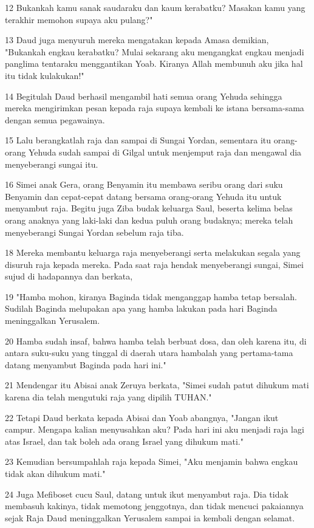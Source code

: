 \par 12 Bukankah kamu sanak saudaraku dan kaum kerabatku? Masakan kamu yang terakhir memohon supaya aku pulang?"
\par 13 Daud juga menyuruh mereka mengatakan kepada Amasa demikian, "Bukankah engkau kerabatku? Mulai sekarang aku mengangkat engkau menjadi panglima tentaraku menggantikan Yoab. Kiranya Allah membunuh aku jika hal itu tidak kulakukan!"
\par 14 Begitulah Daud berhasil mengambil hati semua orang Yehuda sehingga mereka mengirimkan pesan kepada raja supaya kembali ke istana bersama-sama dengan semua pegawainya.
\par 15 Lalu berangkatlah raja dan sampai di Sungai Yordan, sementara itu orang-orang Yehuda sudah sampai di Gilgal untuk menjemput raja dan mengawal dia menyeberangi sungai itu.
\par 16 Simei anak Gera, orang Benyamin itu membawa seribu orang dari suku Benyamin dan cepat-cepat datang bersama orang-orang Yehuda itu untuk menyambut raja. Begitu juga Ziba budak keluarga Saul, beserta kelima belas orang anaknya yang laki-laki dan kedua puluh orang budaknya; mereka telah menyeberangi Sungai Yordan sebelum raja tiba.
\par 18 Mereka membantu keluarga raja menyeberangi serta melakukan segala yang disuruh raja kepada mereka. Pada saat raja hendak menyeberangi sungai, Simei sujud di hadapannya dan berkata,
\par 19 "Hamba mohon, kiranya Baginda tidak menganggap hamba tetap bersalah. Sudilah Baginda melupakan apa yang hamba lakukan pada hari Baginda meninggalkan Yerusalem.
\par 20 Hamba sudah insaf, bahwa hamba telah berbuat dosa, dan oleh karena itu, di antara suku-suku yang tinggal di daerah utara hambalah yang pertama-tama datang menyambut Baginda pada hari ini."
\par 21 Mendengar itu Abisai anak Zeruya berkata, "Simei sudah patut dihukum mati karena dia telah mengutuki raja yang dipilih TUHAN."
\par 22 Tetapi Daud berkata kepada Abisai dan Yoab abangnya, "Jangan ikut campur. Mengapa kalian menyusahkan aku? Pada hari ini aku menjadi raja lagi atas Israel, dan tak boleh ada orang Israel yang dihukum mati."
\par 23 Kemudian bersumpahlah raja kepada Simei, "Aku menjamin bahwa engkau tidak akan dihukum mati."
\par 24 Juga Mefiboset cucu Saul, datang untuk ikut menyambut raja. Dia tidak membasuh kakinya, tidak memotong jenggotnya, dan tidak mencuci pakaiannya sejak Raja Daud meninggalkan Yerusalem sampai ia kembali dengan selamat.
